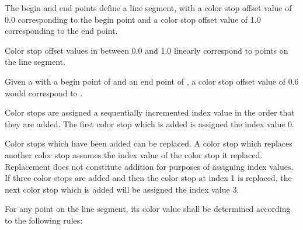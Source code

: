 \pnum
The begin and end points define a line segment, with a color stop offset value of 0.0 corresponding to the begin point and a color stop offset value of 1.0 corresponding to the end point.

\pnum
Color stop offset values in between 0.0 and 1.0 linearly correspond to points on the line segment.

\pnum
\enterexample
Given a  with a begin point of  and an end point of , a color stop offset value of 0.6 would correspond to .
\exitexample

\pnum
Color stops are assigned a sequentially incremented  index value in the order that they are added. The first color stop which is added is assigned the index value 0.

\pnum
Color stops which have been added can be replaced. A color stop which replaces another color stop assumes the index value of the color stop it replaced. Replacement does not constitute addition for purposes of assigning index values.
\enterexample
If three color stops are added and then the color stop at index 1 is replaced, the next color stop which is added will be assigned the index value 3.
\exitexample

\pnum
For any point on the line segment, its color value shall be determined according to the following rules:

